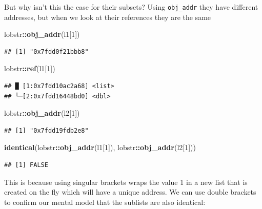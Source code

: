 \documentclass[]{book}
\newenvironment{Shaded}{\begin{snugshade}}{\end{snugshade}}
\newcommand{\DecValTok}[1]{\textcolor[rgb]{0.00,0.00,0.81}{#1}}
\newcommand{\KeywordTok}[1]{\textcolor[rgb]{0.13,0.29,0.53}{\textbf{#1}}}
\newcommand{\NormalTok}[1]{#1}
\newcommand{\OperatorTok}[1]{\textcolor[rgb]{0.81,0.36,0.00}{\textbf{#1}}}
\begin{document}
But why isn't this the case for their subsets? Using \texttt{obj\_addr} they have different addresses, but when we look at their references they are the same

\begin{Shaded}
\begin{Highlighting}[]
\NormalTok{lobstr}\OperatorTok{::}\KeywordTok{obj_addr}\NormalTok{(l1[}\DecValTok{1}\NormalTok{])}
\end{Highlighting}
\end{Shaded}

\begin{verbatim}
## [1] "0x7fdd0f21bbb8"
\end{verbatim}

\begin{Shaded}
\begin{Highlighting}[]
\NormalTok{lobstr}\OperatorTok{::}\KeywordTok{ref}\NormalTok{(l1[}\DecValTok{1}\NormalTok{])}
\end{Highlighting}
\end{Shaded}

\begin{verbatim}
## █ [1:0x7fdd10ac2a68] <list> 
## └─[2:0x7fdd16448bd0] <dbl>
\end{verbatim}

\begin{Shaded}
\begin{Highlighting}[]
\NormalTok{lobstr}\OperatorTok{::}\KeywordTok{obj_addr}\NormalTok{(l2[}\DecValTok{1}\NormalTok{])}
\end{Highlighting}
\end{Shaded}

\begin{verbatim}
## [1] "0x7fdd19fdb2e8"
\end{verbatim}

\begin{Shaded}
\begin{Highlighting}[]
\KeywordTok{identical}\NormalTok{(lobstr}\OperatorTok{::}\KeywordTok{obj_addr}\NormalTok{(l1[}\DecValTok{1}\NormalTok{]), lobstr}\OperatorTok{::}\KeywordTok{obj_addr}\NormalTok{(l2[}\DecValTok{1}\NormalTok{]))}
\end{Highlighting}
\end{Shaded}

\begin{verbatim}
## [1] FALSE
\end{verbatim}

This is because using singular brackets wraps the value 1 in a new list that is created on the fly which will have a unique address. We can use double brackets to confirm our mental model that the sublists are also identical:
\end{document}

